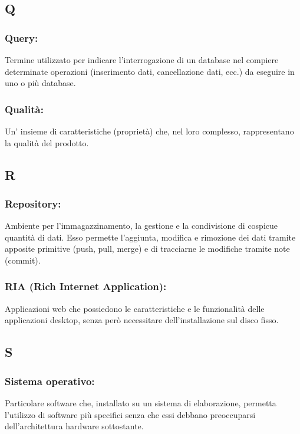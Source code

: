 \subsection*{\huge{Q}}
\subsubsection*{Query:} Termine utilizzato per indicare l'interrogazione di un
database nel compiere determinate operazioni (inserimento dati, cancellazione
dati, ecc.) da eseguire in uno o pi\`u database.

\subsubsection*{Qualit\`a:}
Un' insieme di caratteristiche (propriet\`a) che, nel loro complesso,
rappresentano la qualit\`a del prodotto.

\subsection*{\huge{R}}

\subsubsection*{Repository:} Ambiente per l'immagazzinamento, la gestione e la
condivisione di cospicue quantit\`a di dati. Esso permette l'aggiunta, modifica
e rimozione dei dati tramite apposite primitive (push, pull, merge) e di
tracciarne le modifiche tramite note (commit).

\subsubsection*{RIA (Rich Internet Application):} Applicazioni web che
possiedono le caratteristiche e le funzionalit\`a delle applicazioni desktop, senza per\`o
necessitare dell'installazione sul disco fisso.
  
\subsection*{\huge{S}}
\subsubsection*{Sistema operativo:} Particolare software che, installato su un
sistema di elaborazione, permetta l'utilizzo di software pi\`u specifici senza che
essi debbano preoccuparsi dell'architettura hardware sottostante.

